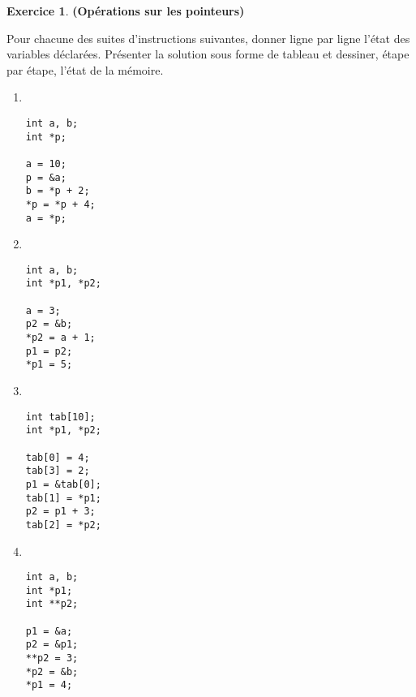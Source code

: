 \documentclass[12pt]{article}
\theoremstyle{definition}
\newtheorem{Exercice}{Exercice}
\begin{document}
\begin{Exercice} {\bf (Opérations sur les pointeurs)}\smallskip

Pour chacune des suites d'instructions suivantes, donner ligne par ligne
l'état des variables déclarées. Présenter la solution sous forme de
tableau et dessiner, étape par étape, l'état de la mémoire.
\begin{multicols}{4}
\begin{enumerate}[label = ({\alph*})]
\item ~
\begin{lstlisting}
int a, b;
int *p;

a = 10;
p = &a;
b = *p + 2;
*p = *p + 4;
a = *p;
\end{lstlisting}
\bigskip

\item ~
\begin{lstlisting}
int a, b;
int *p1, *p2;

a = 3;
p2 = &b;
*p2 = a + 1;
p1 = p2;
*p1 = 5;
\end{lstlisting}
\bigskip

\item ~
\begin{lstlisting}
int tab[10];
int *p1, *p2;

tab[0] = 4;
tab[3] = 2;
p1 = &tab[0];
tab[1] = *p1;
p2 = p1 + 3;
tab[2] = *p2;
\end{lstlisting}

\item ~
\begin{lstlisting}
int a, b;
int *p1;
int **p2;

p1 = &a;
p2 = &p1;
**p2 = 3;
*p2 = &b;
*p1 = 4;
\end{lstlisting}
\end{enumerate}
\end{multicols}
\end{Exercice}
\bigskip
\end{document}
